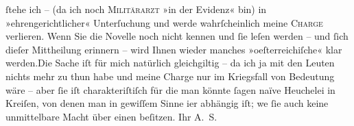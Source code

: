 \begin{ledgroupsized}[t]{13cm}
                        ſtehe ich – (da ich noch \textsc{Militärarzt} »in der
                        Evidenz« bin) in »ehrengerichtlicher« Unterſuchung und werde wahrſcheinlich
                        meine \textsc{Charge} verlieren. Wenn Sie die Novelle {\pb}noch nicht kennen und ſie leſen werden –
                        und ſich dieſer Mittheilung erinnern – wird Ihnen wieder manches »oeſterreichiſche« klar werden.\hspace*{1.5em}Die Sache iſt für mich natürlich gleichgiltig
                        – da ich ja mit den Leuten nichts mehr zu thun habe und meine Charge nur im
                        Kriegsfall von Bedeutung wäre – aber ſie iſt charakteriſtiſch für {\pb}die man könnte ſagen naïve Heuchelei in
                        Kreiſen, von denen man in gewiſſem Sinne i{\geminationm}er
                        abhängig iſt; we{\geminationn}{ }ſie auch keine unmittelbare Macht über
                        einen beſitzen.\pend
           \pstart
           Ihr \spacefill\mbox{A. S.}\pend
           \endnumbering{}\end{ledgroupsized}  \newcommand{\dateiname}{L01114}\newcommand{\titel}{Arthur Schnitzler an Georg Brandes, 25. 4. 1901}\newcommand{\editorInnen}{Martin Anton Müller und Gerd-Hermann Susen}
            \footnotesize
\begin{ledgroupsized}[t]{11.5cm}
\end{ledgroupsized}
         
      